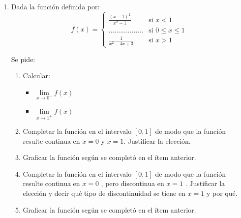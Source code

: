 \documentclass[12pt]{article}
\theoremstyle{definition}
\begin{document}
\begin{enumerate}
\item  
Dada la función definida por:
\begin{equation*}
	f(x) = 
	\begin{cases} 
		\frac{(x-1)^2}{x^2-1 }  & \text{si  } x < 1 \\
		..................& \text{si   } 0 \leq x \leq 1\\
		\frac{1}{x^2-4x+3}  & \text{si  } x > 1
	\end{cases}
\end{equation*}

Se pide:
\begin{enumerate}
	\item Calcular:
		\begin{itemize}
			\item  $\lim\limits_{x \to 0^-} f(x) $
			\item  $\lim\limits_{x \to 1^+} f(x) $
			\end{itemize}
	\item Completar la función en el intervalo $[0,1]$ de modo que la función resulte continua en $x = 0$ y $x =1$. Justificar la elección. 
	\item Graficar la función según se completó en el ítem anterior.
	\item Completar la función en el intervalo $[0,1]$ de modo que la función resulte continua en $x = 0$ , pero discontinua en $x =1$ . Justificar la elección y decir qué tipo de discontinuidad se tiene en $x =1$ y por qué.
	\item Graficar la función según se completó en el ítem anterior.
\end{enumerate}
\end{enumerate}
\end{document}
